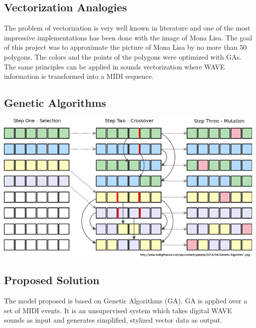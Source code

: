 \documentclass[a0,portrait,25pt]{sciposter}
\begin{document}
\begin{multicols}{3}
\begin{mdframed}[backgroundcolor=white,roundcorner=4pt,shadow=true,linewidth=1pt]
\color{Black}
\section*{Vectorization Analogies}
The problem of vectorization is very well known in literature and one of the most impressive implementations has been done with the image of Mona Lisa. The goal of this project was to approximate the picture of Mona Lisa by no more than 50 polygons. The colors and the points of the polygons were optimized with GAs. The same principles can be applied in sounds vectorization where WAVE information is transformed into a MIDI sequence.
\end{mdframed}

\begin{mdframed}[backgroundcolor=white,roundcorner=4pt,shadow=true,linewidth=1pt]
\section*{Genetic Algorithms}
\begin{minipage}[c]{1\linewidth}
\includegraphics[width=1.0\linewidth]{pic003}
\end{minipage}
\end{mdframed} 
 
\begin{mdframed}[backgroundcolor=white,roundcorner=4pt,shadow=true,linewidth=1pt]
\color{Black}
\section*{Proposed Solution}
The model proposed is based on Genetic Algorithms (GA). GA is applied over a set of MIDI events. It is an unsupervised system which takes digital WAVE sounds as input and generates simplified, stylized vector data as output. 
\end{mdframed} 
 

\end{multicols}
\end{document}
